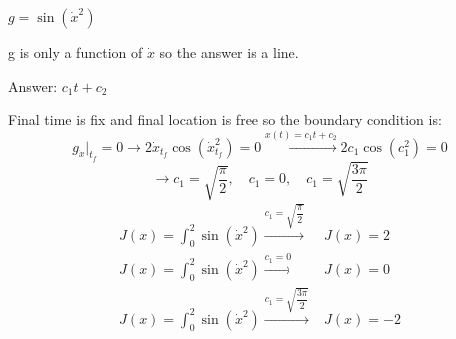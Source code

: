 $g = \sin(\dot x^2)$


g is only a function of $\dot x$ so the answer is a line.



Answer: $c_1t+c_2$


Final time is fix and final location is free so the boundary condition is:
$$g_{\dot x} \vert_{t_f} = 0 \to 2\dot x_{t_f}\cos(\dot x_{t_f}^2) = 0\xrightarrow{x(t) = c_1t+c_2}2c_1\cos(c_1^2) = 0$$
$$\to c_1 = \sqrt{\dfrac{\pi}{2}}, \quad c_1 = 0 ,\quad c_1 = \sqrt{\dfrac{3\pi}{2}}$$
\begin{align}
J(x) = \int_0^2 \sin(\dot x^2)  \xrightarrow{c_1 = \sqrt{\dfrac{\pi}{2}}}  &J(x) = 2\\
J(x) = \int_0^2 \sin(\dot x^2)  \xrightarrow{c_1 = 0 } &J(x) = 0\\
J(x) = \int_0^2 \sin(\dot x^2)  \xrightarrow{c_1 = \sqrt{\dfrac{3\pi}{2}}}  &J(x) = -2
\label{eq:1}
\end{align}
﻿﻿